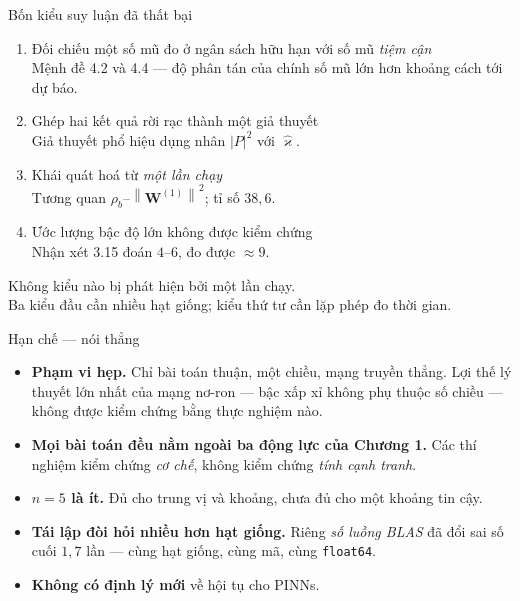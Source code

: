 \documentclass[aspectratio=169,11pt]{beamer}
\newcommand{\bW}{\bm{W}}
\newcommand{\norm}[1]{\left\lVert #1 \right\rVert}
\newcommand{\abs}[1]{\left\lvert #1 \right\rvert}
\begin{document}
\begin{frame}{Bốn kiểu suy luận đã thất bại}
\begin{enumerate}
\item Đối chiếu một số mũ đo ở ngân sách hữu hạn với số mũ \emph{tiệm cận}
  \\{\footnotesize Mệnh đề 4.2 và 4.4 --- độ phân tán của chính số mũ lớn hơn
  khoảng cách tới dự báo.}
\item Ghép hai kết quả rời rạc thành một giả thuyết
  \\{\footnotesize Giả thuyết phổ hiệu dụng nhân $\abs{P}^2$ với $\widehat{\varkappa}$.}
\item Khái quát hoá từ \emph{một lần chạy}
  \\{\footnotesize Tương quan $\rho_b$--$\norm{\bW^{(1)}}^2$; tỉ số $38{,}6$.}
\item Ước lượng bậc độ lớn không được kiểm chứng
  \\{\footnotesize Nhận xét 3.15 đoán $4$--$6$, đo được $\approx 9$.}
\end{enumerate}

\medskip
\centering
\alert{Không kiểu nào bị phát hiện bởi một lần chạy.}\\
Ba kiểu đầu cần nhiều hạt giống; kiểu thứ tư cần lặp phép đo thời gian.
\end{frame}

\begin{frame}{Hạn chế --- nói thẳng}
\small
\begin{itemize}
\item \textbf{Phạm vi hẹp.} Chỉ bài toán thuận, một chiều, mạng truyền thẳng.
  Lợi thế lý thuyết lớn nhất của mạng nơ-ron --- bậc xấp xỉ không phụ thuộc
  số chiều --- \alert{không được kiểm chứng bằng thực nghiệm nào}.

\item \textbf{Mọi bài toán đều nằm ngoài ba động lực của Chương 1.}
  Các thí nghiệm kiểm chứng \emph{cơ chế}, không kiểm chứng
  \emph{tính cạnh tranh}.

\item \textbf{$n = 5$ là ít.} Đủ cho trung vị và khoảng, chưa đủ cho một
  khoảng tin cậy.

\item \textbf{Tái lập đòi hỏi nhiều hơn hạt giống.} Riêng \emph{số luồng BLAS}
  đã đổi sai số cuối $1{,}7$ lần --- cùng hạt giống, cùng mã, cùng
  \texttt{float64}.

\item \textbf{Không có định lý mới} về hội tụ cho PINNs.
\end{itemize}
\end{frame}
\end{document}
